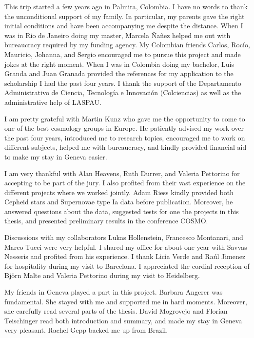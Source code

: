 \documentclass[12pt]{report}
\renewcommand{\(}{\left(}
\renewcommand{\)}{\right)}
\renewcommand{\[}{\left[}
\renewcommand{\]}{\right]}
\begin{document}
\vspace{3mm}

This trip started a few years ago in Palmira, Colombia. I have no words to thank the unconditional support of my family. In particular, my parents gave the right initial conditions and have been accompanying me despite the distance. When I was in Rio de Janeiro doing my master, Marcela \~{N}a\~{n}ez helped me out with bureaucracy required by my funding agency. My Colombian friends Carlos, Roc\'{i}o, Mauricio, Johanna, and Sergio encouraged me to pursue this project and made jokes at the right moment. When I was in Colombia doing my bachelor, Luis Granda and Juan Granada provided the references for my application to the scholarship I had the past four years. I thank the support of the Departamento Administrativo de Ciencia, Tecnolog\'{i}a e Innovaci\'{o}n (Colciencias) as well as the administrative help of LASPAU.  

I am pretty grateful with Martin Kunz who gave me the opportunity to come to one of the best cosmology groups in Europe. He patiently advised my work over the past four years, introduced me to research topics, encouraged me to work on different subjects, helped me with bureaucracy, and kindly provided financial aid to make my stay in Geneva easier.  

I am very thankful with Alan Heavens, Ruth Durrer, and Valeria Pettorino  for accepting to be part of the jury. I also  profited from their vast experience on the different projects where we worked jointly. Adam Riess kindly provided both Cepheid stars and Supernovae type Ia data before publication. Moreover, he answered questions about the data, suggested tests for one the projects in this thesis, and presented preliminary results in the conference COSMO.

Discussions with my collaborators Lukas Hollenstein, Francesco Montanari, and Marco Tucci were very helpful. I shared my office for about one year with Savvas Nesseris and profited from his experience. I thank Licia Verde and Ra\'{u}l Jimenez for hospitality during my visit to Barcelona. I appreciated the cordial reception of Bj\"{o}rn Malte and Valeria Pettorino during my visit to Heidelberg. 

My friends in Geneva played a part in this project. Barbara Angerer was fundamental. She stayed with me and supported me in hard moments. Moreover, she carefully read several parts of the thesis. David Mogrovejo and Florian Teischinger read both introduction and summary, and made my stay in Geneva very pleasant. Rachel Gepp backed me up from Brazil. 
\end{document}
